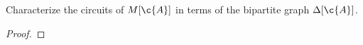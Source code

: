 \prob
{
    Characterize the circuits of $M[\c{A}]$ in terms of the bipartite graph $\Delta[\c{A}]$.
}
\begin{proof}
\end{proof}
